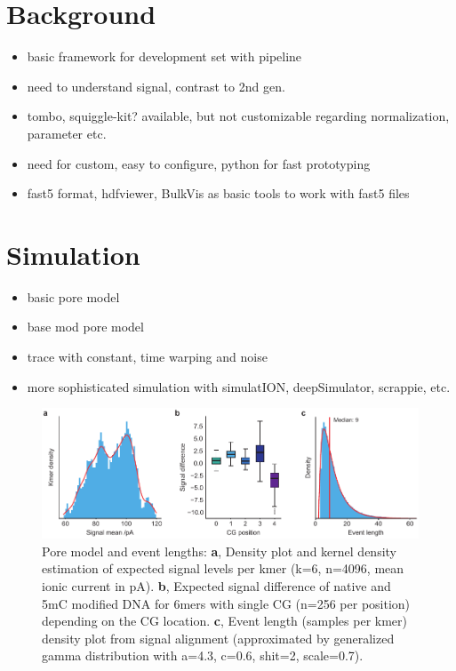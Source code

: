 \section{Background}
\label{sec:signal:background}



\begin{itemize}
	\item basic framework for development set with pipeline
	\item need to understand signal, contrast to 2nd gen.
	\item tombo, squiggle-kit? available, but not customizable regarding normalization, parameter etc.
	\item need for custom, easy to configure, python for fast prototyping
	\item fast5 format, hdfviewer, BulkVis as basic tools to work with fast5 files
\end{itemize}




\section{Simulation}
\label{sec:signal:simulation}

\begin{itemize}
    \item basic pore model
    \item base mod pore model
    \item trace with constant, time warping and noise
    \item more sophisticated simulation with simulatION, deepSimulator, scrappie, etc.
\end{itemize}

\begin{figure}[h]
	\centering
	\includegraphics[width=1.0\textwidth]{figures/signal/pm.pdf}
	\captionsetup{format=plain}
	\caption[Pore model and event length]{Pore model and event lengths: \textbf{a}, Density plot and kernel density estimation of expected signal levels per kmer (k=6, n=4096, mean ionic current in pA). \textbf{b}, Expected signal difference of native and 5mC modified DNA for 6mers with single CG (n=256 per position) depending on the CG location. \textbf{c}, Event length (samples per kmer) density plot from signal alignment (approximated by generalized gamma distribution with a=4.3, c=0.6, shit=2, scale=0.7).}
	\label{fig:signal:pm}
\end{figure}


